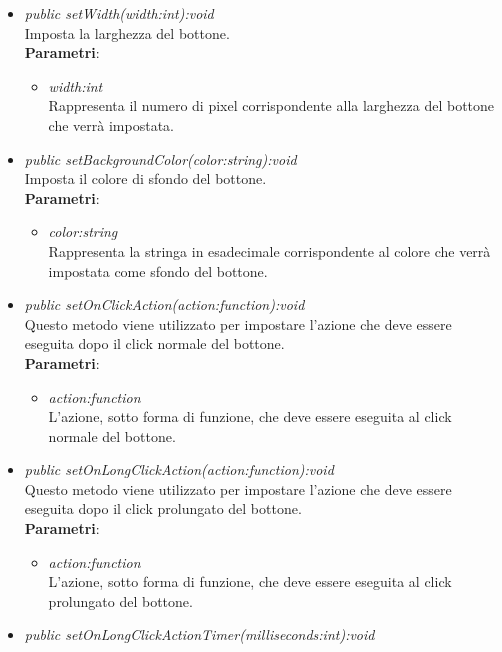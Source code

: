 \begin{itemize}
\begin{itemize}
\begin{itemize}
		\end{itemize}
	\item \textit{public setWidth(width:int):void}\\
	Imposta la larghezza del bottone.
		\\ \textbf{Parametri}: \begin{itemize}
		\item \textit{width:int}\\
		Rappresenta il numero di pixel corrispondente alla larghezza del bottone che verrà impostata.
		\end{itemize}
	\item \textit{public setBackgroundColor(color:string):void}\\
	Imposta il colore di sfondo del bottone.
		\\ \textbf{Parametri}: \begin{itemize}
		\item \textit{color:string}\\
		Rappresenta la stringa in esadecimale corrispondente al colore che verrà impostata come sfondo del bottone.
		\end{itemize}
	\item \textit{public setOnClickAction(action:function):void}\\
	Questo metodo viene utilizzato per impostare l'azione che deve essere eseguita dopo il click normale del bottone.
		\\ \textbf{Parametri}: \begin{itemize}
		\item \textit{action:function}\\
		L'azione, sotto forma di funzione, che deve essere eseguita al click normale del bottone.
		\end{itemize}
	\item \textit{public setOnLongClickAction(action:function):void}\\
		Questo metodo viene utilizzato per impostare l'azione che deve essere eseguita dopo il click prolungato del bottone.
		\\ \textbf{Parametri}: \begin{itemize}
		\item \textit{action:function}\\
		L'azione, sotto forma di funzione, che deve essere eseguita al click prolungato del bottone.
		\end{itemize}
	\item \textit{public setOnLongClickActionTimer(milliseconds:int):void}\\

\end{itemize}
\end{itemize}
